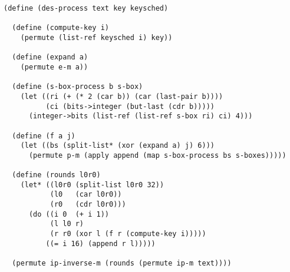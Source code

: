 
\topmargin      -1.0cm
\oddsidemargin  -1.0cm
\evensidemargin -1.0cm
\textwidth       5.7in
\textheight      9.0in



\Large
\begin{verbatim}
(define (des-process text key keysched)

  (define (compute-key i)
    (permute (list-ref keysched i) key))

  (define (expand a)
    (permute e-m a))

  (define (s-box-process b s-box)
    (let ((ri (+ (* 2 (car b)) (car (last-pair b))))
          (ci (bits->integer (but-last (cdr b)))))
      (integer->bits (list-ref (list-ref s-box ri) ci) 4)))

  (define (f a j)
    (let ((bs (split-list* (xor (expand a) j) 6)))
      (permute p-m (apply append (map s-box-process bs s-boxes)))))

  (define (rounds l0r0)
    (let* ((l0r0 (split-list l0r0 32))
           (l0   (car l0r0))
           (r0   (cdr l0r0)))
      (do ((i 0  (+ i 1))
           (l l0 r)
           (r r0 (xor l (f r (compute-key i)))))
          ((= i 16) (append r l)))))

  (permute ip-inverse-m (rounds (permute ip-m text))))
\end{verbatim}

